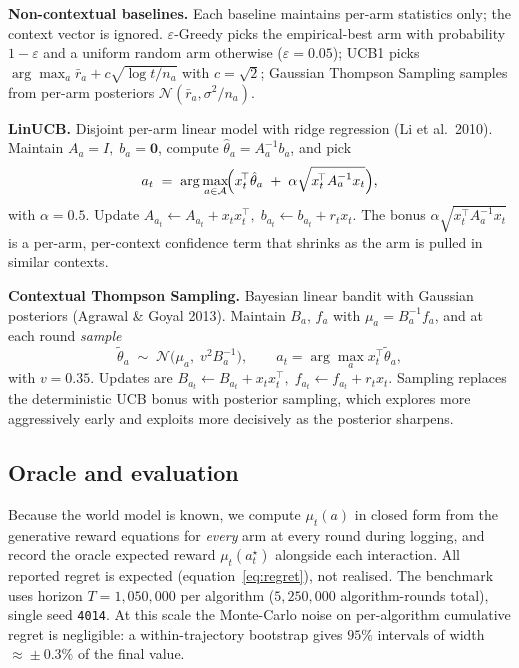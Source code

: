 \documentclass[11pt,a4paper]{article}
\begin{document}
\textbf{Non-contextual baselines.}
Each baseline maintains per-arm statistics only; the context vector is ignored.
$\varepsilon$-Greedy picks the empirical-best arm with probability $1-\varepsilon$
and a uniform random arm otherwise ($\varepsilon=0.05$); UCB1 picks
$\arg\max_a \bar r_a + c\sqrt{\log t / n_a}$ with $c=\sqrt{2}$; Gaussian
Thompson Sampling samples from per-arm posteriors $\mathcal{N}(\bar
r_a,\sigma^2/n_a)$.

\textbf{LinUCB.}
Disjoint per-arm linear model with ridge regression (Li et al.\ 2010). Maintain
$A_a=I,\; b_a=\mathbf{0}$, compute $\hat\theta_a=A_a^{-1}b_a$, and pick
\begin{equation}
a_t\;=\;\arg\max_{a\in\mathcal{A}}\!\Bigl(x_t^{\!\top}\hat\theta_a
\;+\;\alpha\sqrt{x_t^{\!\top}A_a^{-1}x_t}\Bigr),
\label{eq:linucb}
\end{equation}
with $\alpha=0.5$. Update
$A_{a_t}\!\leftarrow\! A_{a_t}+x_tx_t^{\!\top},\;
b_{a_t}\!\leftarrow\! b_{a_t}+r_tx_t$. The bonus
$\alpha\sqrt{x_t^{\!\top}A_a^{-1}x_t}$ is a per-arm, per-context confidence
term that shrinks as the arm is pulled in similar contexts.

\textbf{Contextual Thompson Sampling.}
Bayesian linear bandit with Gaussian posteriors (Agrawal \& Goyal 2013).
Maintain $B_a,\,f_a$ with $\mu_a=B_a^{-1}f_a$, and at each round \emph{sample}
\begin{equation}
\tilde\theta_a \;\sim\; \mathcal{N}\!\bigl(\mu_a,\; v^{2}B_a^{-1}\bigr),
\qquad a_t = \arg\max_{a} x_t^{\!\top}\tilde\theta_a,
\label{eq:cts}
\end{equation}
with $v=0.35$. Updates are
$B_{a_t}\!\leftarrow\! B_{a_t}+x_tx_t^{\!\top},\;
f_{a_t}\!\leftarrow\! f_{a_t}+r_tx_t$. Sampling replaces the deterministic UCB
bonus with posterior sampling, which explores more aggressively early and
exploits more decisively as the posterior sharpens.

\subsection{Oracle and evaluation}

Because the world model is known, we compute $\mu_t(a)$ in closed form from the
generative reward equations for \emph{every} arm at every round during logging,
and record the oracle expected reward $\mu_t(a_t^\star)$ alongside each
interaction. All reported regret is expected (equation~\ref{eq:regret}), not
realised. The benchmark uses horizon $T=1{,}050{,}000$ per algorithm
($5{,}250{,}000$ algorithm-rounds total), single seed \texttt{4014}. At this
scale the Monte-Carlo noise on per-algorithm cumulative regret is negligible:
a within-trajectory bootstrap gives $95\%$ intervals of width $\approx\!\pm
0.3\%$ of the final value.
\end{document}
